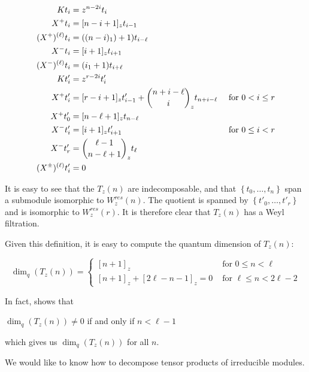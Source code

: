 \begin{align*}
    Kt_i &= z^{n-2i} t_i \\
    X^+ t_i &= [n-i+1]_z t_{i-1} \\
    (X^+)^{(\ell)} t_i &= ( (n-i)_1) + 1) t_{i-\ell} \\
    X^-t_i &= [i+1]_z t_{i+1} \\
    (X^-)^{(\ell)} t_i &= ( i_1 + 1) t_{i+\ell} \\
    Kt'_i &= z^{r-2i} t'_i \\
    X^+ t'_i &= [r-i+1]_z t'_{i-1}  + \dbinom{n + i - \ell}{i}_z t_{n+i-\ell} &\text{ for $0 < i \leq r$}\\
    X^+ t'_0 &= [n - \ell + 1]_z t_{n-\ell} \\
    X^-t'_i &= [i+1]_z t'_{i+1} &\text{ for $0 \leq i < r$}\\
    X^- t'_r &= \dbinom{\ell - 1}{n - \ell + 1}_z t_\ell \\
    (X^\pm)^{(\ell)} t'_i  &= 0
\end{align*}


It is easy to see that the $T_z(n)$ are indecomposable, and that $\left\{ t_0,
\ldots, t_n \right\}$ span a submodule isomorphic to $W_z^{res}(n)$. The
quotient is spanned by $\left\{ t'_0, \ldots, t'_r \right\}$ and is
isomorphic to $W_z^{res}(r)$. It is therefore clear that $T_z(n)$ has a Weyl
filtration. 

Given this definition, it is easy to compute the quantum dimension of $T_z(n)$: 

\begin{equation}
    \dim_q(T_z(n)) = \begin{cases} [n+1]_z &\text{ for $0 \leq n < \ell$} \\
                                   [n+1]_z + [2\ell-n-1]_z = 0 &\text{ for $\ell \leq n < 2\ell - 2$}
                     \end{cases}
\end{equation}

In fact, \cite{andersen1992} shows that 
\begin{prop}
$\dim_q(T_z(n)) \neq 0$ if and only if $n < \ell - 1$
\end{prop}

which gives us $\dim_q(T_z(n))$ for all $n$.

We would like to know how to decompose tensor products of irreducible modules. 

